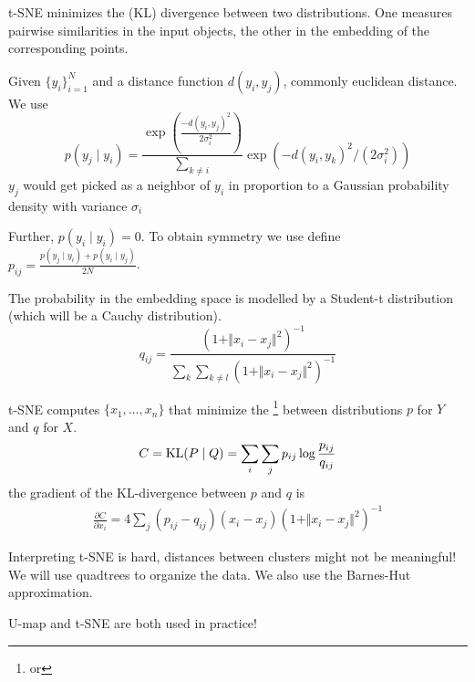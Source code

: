 t-SNE minimizes the (KL) divergence between two distributions. One measures pairwise similarities in the input 
objects, the other in the embedding of the corresponding points. 

Given $\{y_i\}_{i=1}^N$ and a distance function $d(y_i,y_j)$, commonly euclidean distance. We use 
\[p(y_j\mid y_i)=\frac{\exp(\frac{-d(y_i,y_j)^2}{2\sigma_i^2})}{\sum_{k\neq i}}\exp(-d(y_i,y_k)^2/(2\sigma_i^2))\]
$y_j$ would get picked as a neighbor of $y_i$ in proportion to a Gaussian probability density with variance $\sigma_i$

Further, $p(y_i\mid y_i)=0$. To obtain symmetry we use define $p_{ij}=\frac{p(y_j\mid y_i)+p(y_i\mid y_j)}{2N}$.

The probability in the embedding space is modelled by a Student-t distribution (which will be a Cauchy distribution).
\[q_{ij}=\frac{(1+\Vert x_i-x_j\Vert^2)^{-1}}{\sum_{k}\sum_{k\neq l}(1+\Vert x_i-x_j\Vert^2)^{-1}}\]

t-SNE computes $\{x_1,\dots,x_n\}$ that minimize the \footnote{or } between distributions $p$ for $Y$ and $q$ for $X$.
\[C={\text{KL}}(P\mid Q)=\sum_{i}\sum_{j}p_{ij}\log\frac{p_{ij}}{q_{ij}}\]
the gradient of the KL-divergence between $p$ and $q$ is 
\begin{align*}
    \frac{\partial C}{\partial x_i}=4\sum_{j}(p_{ij}-q_{ij}) (x_i-x_j)(1+\Vert x_i-x_j\Vert^2)^{-1}
\end{align*}

\begin{aremark}
    Interpreting t-SNE is hard, distances between clusters might not be meaningful! We will use quadtrees to organize the data. We also use the Barnes-Hut approximation.
\end{aremark}

\begin{aremark}
    U-map and t-SNE are both used in practice!
\end{aremark}



